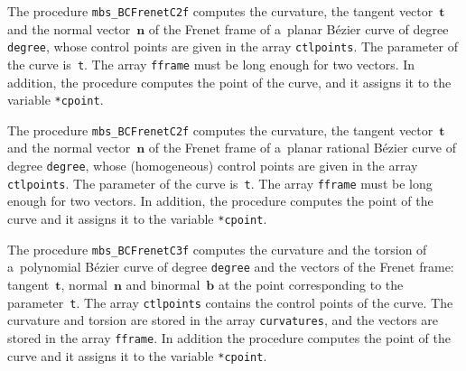 \vspace{\bigskipamount}
The procedure \texttt{mbs\_BCFrenetC2f} computes the curvature, the tangent
vector~$\bm{t}$ and the normal vector~$\bm{n}$ of the Frenet frame of
a~planar B\'{e}zier curve of degree \texttt{degree}, whose control points
are given in the array \texttt{ctlpoints}. The parameter of the curve
is~\texttt{t}. The array \texttt{fframe} must be long enough for two vectors.
In addition, the procedure computes the point of the curve, and it
assigns it to the variable \texttt{*cpoint}.

\vspace{\bigskipamount}
The procedure \texttt{mbs\_BCFrenetC2f} computes the curvature,
the tangent vector~$\bm{t}$ and the normal vector~$\bm{n}$ of the Frenet frame
of a~planar rational B\'{e}zier curve of degree \texttt{degree},
whose (homogeneous) control points are given in the array
\texttt{ctlpoints}. The parameter of the curve is~\texttt{t}.
The array \texttt{fframe} must be long enough for two vectors.
In addition, the procedure computes the point of the curve and it
assigns it to the variable \texttt{*cpoint}.

\vspace{\bigskipamount}
The procedure \texttt{mbs\_BCFrenetC3f} computes the curvature and the torsion
of a~polynomial B\'{e}zier curve of degree \texttt{degree} and the vectors
of the Frenet frame: tangent~$\bm{t}$, normal~$\bm{n}$ and binormal~$\bm{b}$
at the point corresponding to the parameter~\texttt{t}. The array
\texttt{ctlpoints} contains the control points of the curve.
The curvature and torsion are stored in the array \texttt{curvatures}, and
the vectors are stored in the array \texttt{fframe}. In addition the procedure
computes the point of the curve and it assigns it to the variable
\texttt{*cpoint}.

